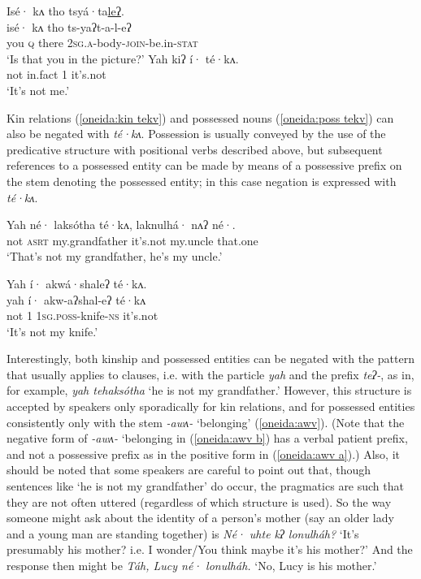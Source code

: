 \documentclass[output=paper,colorlinks,citecolor=brown]{langscibook}
\begin{document}
\ea\label{oneida:ident 2} 
    \begin{xlist}[B: ]
            \glll  Isé· kʌ tho tsyá·ta\uline{leʔ}. \\
                isé· kʌ tho ts-yaʔt-a-l-eʔ \\
                you \textsc{q} there \textsc{2sg.a}-body-\textsc{join}-be.in-\textsc{stat} \\
            \glt  `Is that you in the picture?'
            \gll  Yah kiʔ í· té·kʌ. \\
                not {in.fact} \textsc{1} {it's.not} \\
            \glt  `It's not me.' 
    \end{xlist}
\z

Kin relations (\ref{oneida:kin tekv}) and possessed nouns (\ref{oneida:poss tekv}) can also be negated with \textit{té·kʌ}. Possession is usually conveyed by the use of the predicative structure with positional verbs described above, but subsequent references to a possessed entity can be made by means of a possessive prefix on the stem denoting the possessed entity; in this case negation is expressed with \textit{té·kʌ}.

\ea\label{oneida:kin tekv}
    \gll Yah né· laks\'otha té·kʌ, laknulhá· {nʌʔ né·}. \\
    not \textsc{asrt} {my.grandfather} {it's.not} {my.uncle} {that.one} \\
    \glt `That's not my grandfather, he's my uncle.' 
\z

\ea\label{oneida:poss tekv}
    \glll Yah í· akwá·shaleʔ té·kʌ. \\
    yah í· akw-aʔshal-eʔ té·kʌ \\
    not \textsc{1} \textsc{1sg.poss}-knife-\textsc{ns} {it's.not} \\
    \glt `It's not my knife.'  
\z

Interestingly, both kinship and possessed entities can be negated with the pattern that usually applies to clauses, i.e. with the particle \textit{yah} and the prefix \textit{teʔ-}, as in, for example, \textit{yah tehaks\'otha} `he is not my grandfather.' However, this structure is accepted by speakers only sporadically for kin relations, and for possessed entities consistently only with the stem \textit{-awʌ-} `belonging' (\ref{oneida:awv}). (Note that the negative form of \textit{-awʌ-} `belonging in (\ref{oneida:awv b}) has a verbal patient prefix, and not a possessive prefix as in the positive form in (\ref{oneida:awv a}).) Also, it should be noted that some speakers are careful to point out that, though sentences like `he is not my grandfather' do occur, the pragmatics are such that they are not often uttered (regardless of which structure is used). So the way someone might ask about the identity of a person's mother (say an older lady and a young man are standing together) is \textit{Né· uhte kʔ lonulháh?} `It's presumably his mother? i.e. I wonder/You think maybe it's his mother?' And the response then might be \textit{Táh, Lucy né· lonulháh.} `No, Lucy is his mother.'
\end{document}
